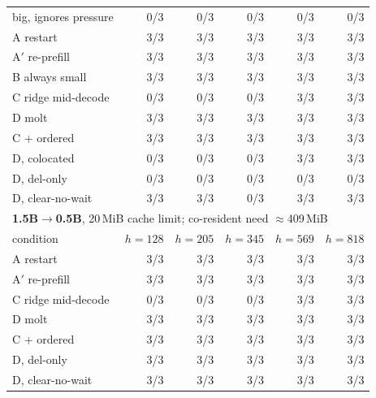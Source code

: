 \begin{table}[t]
\begin{tabular}{lrrrrr}
big, ignores pressure & 0/3 & 0/3 & 0/3 & 0/3 & 0/3 \\
A restart & 3/3 & 3/3 & 3/3 & 3/3 & 3/3 \\
A$'$ re-prefill & 3/3 & 3/3 & 3/3 & 3/3 & 3/3 \\
B always small & 3/3 & 3/3 & 3/3 & 3/3 & 3/3 \\
C ridge mid-decode & 0/3 & 0/3 & 0/3 & 3/3 & 3/3 \\
D molt & 3/3 & 3/3 & 3/3 & 3/3 & 3/3 \\
C + ordered & 3/3 & 3/3 & 3/3 & 3/3 & 3/3 \\
D, colocated & 0/3 & 0/3 & 0/3 & 3/3 & 3/3 \\
D, del-only & 0/3 & 0/3 & 0/3 & 0/3 & 0/3 \\
D, clear-no-wait & 3/3 & 3/3 & 0/3 & 3/3 & 3/3 \\
\midrule
\multicolumn{6}{l}{\textbf{1.5B$\to$0.5B}, 20\,MiB cache limit; co-resident need $\approx$409\,MiB} \\
condition & $h=128$ & $h=205$ & $h=345$ & $h=569$ & $h=818$ \\ \midrule
A restart & 3/3 & 3/3 & 3/3 & 3/3 & 3/3 \\
A$'$ re-prefill & 3/3 & 3/3 & 3/3 & 3/3 & 3/3 \\
C ridge mid-decode & 0/3 & 0/3 & 0/3 & 3/3 & 3/3 \\
D molt & 3/3 & 3/3 & 3/3 & 3/3 & 3/3 \\
C + ordered & 3/3 & 3/3 & 3/3 & 3/3 & 3/3 \\
D, del-only & 3/3 & 3/3 & 3/3 & 3/3 & 3/3 \\
D, clear-no-wait & 3/3 & 3/3 & 3/3 & 3/3 & 3/3 \\
\bottomrule
\end{tabular}\end{table}
